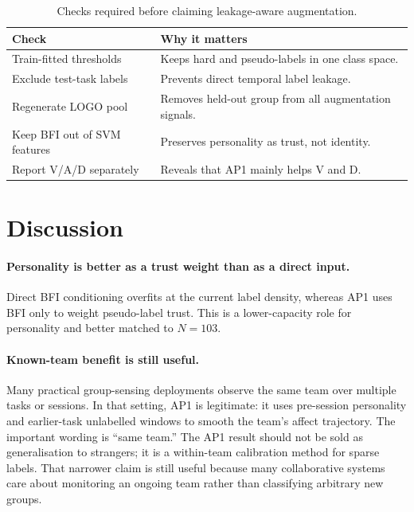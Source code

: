 \documentclass[sigconf,review,anonymous]{acmart}
\begin{document}
\begin{table}[t]
\caption{Checks required before claiming leakage-aware augmentation.}
\label{tab:checks}
\centering
\setlength{\tabcolsep}{3pt}
\small
\begin{tabular}{>{\raggedright\arraybackslash}p{}>{\raggedright\arraybackslash}p{}}
\toprule
\textbf{Check} & \textbf{Why it matters} \\
\midrule
Train-fitted thresholds & Keeps hard and pseudo-labels in one class space. \\
Exclude test-task labels & Prevents direct temporal label leakage. \\
Regenerate LOGO pool & Removes held-out group from all augmentation signals. \\
Keep BFI out of SVM features & Preserves personality as trust, not identity. \\
Report V/A/D separately & Reveals that AP1 mainly helps V and D. \\
\bottomrule
\end{tabular}
\end{table}

\section{Discussion}
\label{sec:discussion}

\paragraph{Personality is better as a trust weight than as a direct input.}
Direct BFI conditioning overfits at the current label density, whereas AP1
uses BFI only to weight pseudo-label trust.
This is a lower-capacity role for personality and better matched to $N=103$.

\paragraph{Known-team benefit is still useful.}
Many practical group-sensing deployments observe the same team over multiple
tasks or sessions.
In that setting, AP1 is legitimate: it uses pre-session personality and
earlier-task unlabelled windows to smooth the team's affect trajectory.
The important wording is ``same team.''
The AP1 result should not be sold as generalisation to strangers; it is a
within-team calibration method for sparse labels.
That narrower claim is still useful because many collaborative systems care
about monitoring an ongoing team rather than classifying arbitrary new groups.
\end{document}
